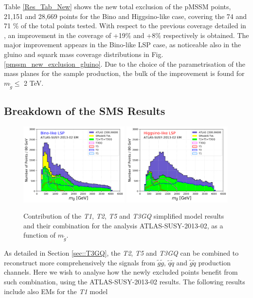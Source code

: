 \documentclass[a4paper,11pt]{article}
\newcommand{\MGLU}{$ m _{ \tilde g } $\xspace}
\begin{document}
%
Table \ref{Res_Tab_New} shows the new total exclusion of the pMSSM points, 21,151 and 28,669 points for the Bino and Higgsino-like case, covering the 74 and 71 $\%$ of the total points tested. With respect to the previous coverage detailed in \cite{Ambrogi:2017lov}, an improvement in the coverage of +19$\%$ and +8$\%$ respectively is obtained.
%
The major improvement appears in the Bino-like LSP case, as noticeable also in the gluino and squark mass coverage distributions in Fig. \ref{pmssm_new_exclusion_gluino}. Due to the choice of the parametrisation of the mass planes for the sample production, the bulk of the improvement is found for $m_{\tilde g}\leq$ 2 TeV. 
%
\subsection{Breakdown of the SMS Results}
\begin{figure}
	\begin{center}
		\subfigure
		{\includegraphics[width=0.49\textwidth]{PLOTS/Combination/Bino_Con.png}}
		\subfigure
		{\includegraphics[width=0.49\textwidth]{PLOTS/Combination/Higgsino_Con.png}}
	\end{center}
	\caption{Contribution of the \textit{T1}, \textit{T2}, \textit{T5} and \textit{T3GQ} simplified model results and their combination for the analysis ATLAS-SUSY-2013-02, as a function of \MGLU.} 
	\label{sms-histo}
\end{figure}
As detailed in Section \ref{sec::T3GQ}, the \textit{T2}, \textit{T5} and \textit{T3GQ} can be combined to reconstruct more comprehensively the signals from $\tilde g \tilde g$, $\tilde q \tilde q$ and $\tilde g \tilde q$ production channels. Here we wish to analyse how the newly excluded points benefit from such combination, using the ATLAS-SUSY-2013-02 results. The following results include also EMs for the \textit{T1} model 
\end{document}
